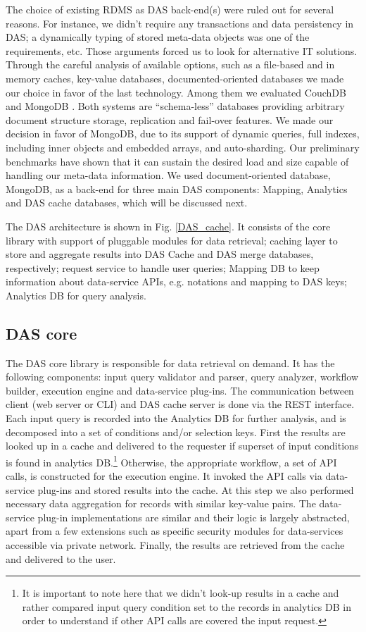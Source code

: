 \documentclass[1p,times]{elsarticle}
\begin{document}
\noindent
The choice of existing RDMS as DAS back-end(s) were ruled out for several reasons. 
For instance, we didn't require any transactions and data persistency in DAS;
a dynamically typing of stored meta-data objects was one of the requirements, etc.
Those arguments forced us to look for alternative IT solutions.
Through the careful analysis of available options, such as a file-based and in memory caches, 
key-value databases, documented-oriented databases we made our choice in favor 
of the last technology. Among them we evaluated CouchDB \cite{CouchDB} and 
MongoDB \cite{MongoDB}. Both systems are ``schema-less'' databases providing
arbitrary document structure storage, replication and fail-over features. 
We made our decision in favor of MongoDB, due to its support of dynamic queries, 
full indexes, including inner objects and embedded arrays,
and auto-sharding. Our preliminary benchmarks have shown that it can sustain
the desired load and size capable of handling our meta-data information. We used 
document-oriented database, MongoDB, as a back-end for three 
main DAS components: Mapping, Analytics and DAS cache databases, 
which will be discussed next. 

The DAS architecture is shown in Fig. \ref{DAS_cache}. It consists of
the core library with support of pluggable modules for data retrieval;
caching layer to store and aggregate results into DAS Cache and DAS merge
databases, respectively;
request service to handle user queries;
Mapping DB to keep information about data-service APIs, e.g.
notations and mapping to DAS keys;
Analytics DB for query analysis.

\subsection{DAS core\label{DAS_core}}
The DAS core library is responsible for data retrieval on demand. 
It has the following components: input query validator and parser,
query analyzer, workflow builder, execution engine and data-service 
plug-ins. The communication between client (web server or CLI) and 
DAS cache server is done via the REST \cite{REST} interface. 
Each input query is recorded into the Analytics DB for further 
analysis, and is decomposed into a set of conditions and/or selection keys.
First the results are looked up in a cache and delivered to the requester
if superset of input conditions is found in analytics DB.\footnote{It is important
to note here that we didn't look-up results in a cache and rather
compared input query condition set to the records in analytics DB 
in order to understand if other API calls are covered the input request.}
Otherwise, the appropriate workflow, a set of API calls, is constructed
for the execution engine. It invoked the API calls via data-service
plug-ins and stored results into the cache. At this step we also
performed necessary data aggregation for records with similar key-value
pairs. The data-service plug-in implementations are similar and their 
logic is largely abstracted, apart from a few extensions such as specific
security modules for data-services accessible via private network.
Finally, the results are retrieved from the cache and delivered to the user. 
\end{document}
